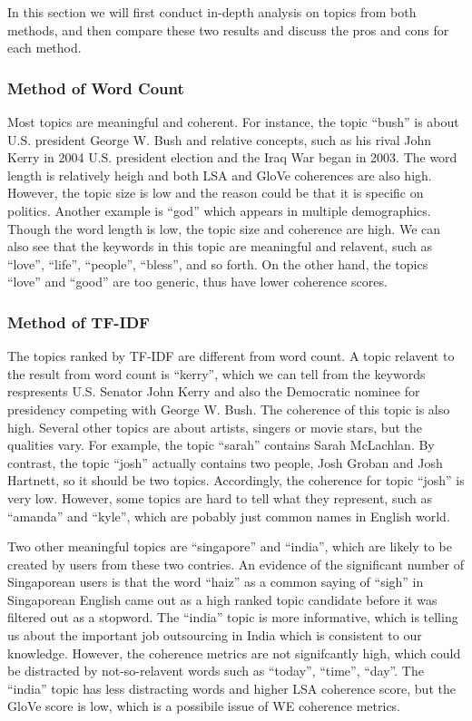 \documentclass[conference]{IEEEtran}
\begin{document}
In this section we will first conduct in-depth analysis on topics from
both methods, and then compare these two results and discuss the pros
and cons for each method.

\hypertarget{method-of-word-count}{%
\subsubsection{Method of Word Count}\label{method-of-word-count}}

Most topics are meaningful and coherent. For instance, the topic
``bush'' is about U.S. president George W. Bush and relative concepts,
such as his rival John Kerry in 2004 U.S. president election and the
Iraq War began in 2003. The word length is relatively heigh and both LSA
and GloVe coherences are also high. However, the topic size is low and
the reason could be that it is specific on politics. Another example is
``god'' which appears in multiple demographics. Though the word length
is low, the topic size and coherence are high. We can also see that the
keywords in this topic are meaningful and relavent, such as ``love'',
``life'', ``people'', ``bless'', and so forth. On the other hand, the
topics ``love'' and ``good'' are too generic, thus have lower coherence
scores.

\hypertarget{sec:tf-idf-analysis}{%
\subsubsection{Method of TF-IDF}\label{sec:tf-idf-analysis}}

The topics ranked by TF-IDF are different from word count. A topic
relavent to the result from word count is ``kerry'', which we can tell
from the keywords respresents U.S. Senator John Kerry and also the
Democratic nominee for presidency competing with George W. Bush. The
coherence of this topic is also high. Several other topics are about
artists, singers or movie stars, but the qualities vary. For example,
the topic ``sarah'' contains Sarah McLachlan. By contrast, the topic
``josh'' actually contains two people, Josh Groban and Josh Hartnett, so
it should be two topics. Accordingly, the coherence for topic ``josh''
is very low. However, some topics are hard to tell what they represent,
such as ``amanda'' and ``kyle'', which are pobably just common names in
English world.

Two other meaningful topics are ``singapore'' and ``india'', which are
likely to be created by users from these two contries. An evidence of
the significant number of Singaporean users is that the word ``haiz'' as
a common saying of ``sigh'' in Singaporean English came out as a high
ranked topic candidate before it was filtered out as a stopword. The
``india'' topic is more informative, which is telling us about the
important job outsourcing in India which is consistent to our knowledge.
However, the coherence metrics are not signifcantly high, which could be
distracted by not-so-relavent words such as ``today'', ``time'',
``day''. The ``india'' topic has less distracting words and higher LSA
coherence score, but the GloVe score is low, which is a possibile issue
of WE coherence metrics.
\end{document}
